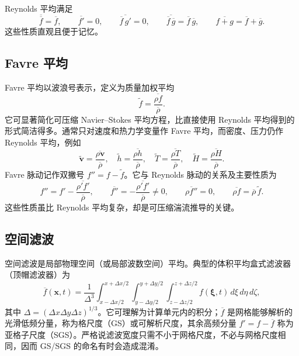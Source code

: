 \documentclass[11pt,a4paper,openany,fontset=none]{ctexbook}
\begin{document}
Reynolds 平均满足
\begin{equation}
 \overline{\overline f}=\overline f,\qquad
 \overline{f'}=0,\qquad
 \overline{\overline f\,g'}=0,\qquad
 \overline{\overline f\,\overline g}=\overline f\,\overline g,\qquad
 \overline{f+g}=\overline f+\overline g. \tag{5.1.6--5.1.10}
\end{equation}
这些性质直观且便于记忆。

\subsection{Favre 平均}

Favre 平均以波浪号表示，定义为质量加权平均
\begin{equation}
 \widetilde f=\frac{\overline{\rho f}}{\overline\rho}. \tag{5.1.11}
\end{equation}
它可显著简化可压缩 Navier--Stokes 平均方程，比直接使用 Reynolds 平均得到的形式简洁得多。通常只对速度和热力学变量作 Favre 平均，而密度、压力仍作 Reynolds 平均，例如
\begin{equation}
 \widetilde{\bm v}=\frac{\overline{\rho\bm v}}{\overline\rho},\quad
 \widetilde h=\frac{\overline{\rho h}}{\overline\rho},\quad
 \widetilde T=\frac{\overline{\rho T}}{\overline\rho},\quad
 \widetilde H=\frac{\overline{\rho H}}{\overline\rho}. \tag{5.1.12}
\end{equation}
Favre 脉动记作双撇号 $f''=f-\widetilde f$。它与 Reynolds 脉动的关系及主要性质为
\begin{equation}
 f''=f'-\frac{\overline{\rho'f'}}{\overline\rho},\qquad
 \overline{f''}=-\frac{\overline{\rho'f'}}{\overline\rho}\ne0,\qquad
 \overline{\rho f''}=0,\qquad
 \overline{\rho f}=\overline\rho\,\widetilde f. \tag{5.1.14--5.1.18}
\end{equation}
这些性质虽比 Reynolds 平均复杂，却是可压缩湍流推导的关键。

\subsection{空间滤波}

空间滤波是局部物理空间（或局部波数空间）平均。典型的体积平均盒式滤波器（顶帽滤波器）为
\begin{equation}
 \overline f(\bm x,t)=\frac1{\Delta^3}
 \int_{x-\Delta x/2}^{x+\Delta x/2}
 \int_{y-\Delta y/2}^{y+\Delta y/2}
 \int_{z-\Delta z/2}^{z+\Delta z/2}f(\bm\xi,t)\,d\xi\,d\eta\,d\zeta, \tag{5.1.19}
\end{equation}
其中 $\Delta=(\Delta x\Delta y\Delta z)^{1/3}$。它可理解为计算单元内的积分；$\overline f$ 是网格能够解析的光滑低频分量，称为格尺度（GS）或可解析尺度，其余高频分量 $f'=f-\overline f$ 称为亚格子尺度（SGS）。严格说滤波宽度只需不小于网格尺度，不必与网格尺度相同，因而 GS/SGS 的命名有时会造成混淆。
\end{document}
